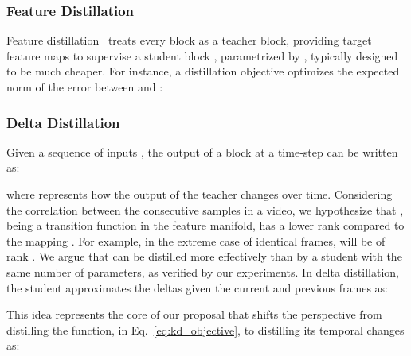 \documentclass[runningheads]{llncs}
\begin{document}
\subsubsection{Feature Distillation}
Feature distillation~\cite{fitnets} treats every block  as a teacher block, providing target feature maps to supervise a student block , parametrized by , typically designed to be much cheaper.
For instance, a distillation objective optimizes the expected  norm of the error between  and :


\subsubsection{Delta Distillation}
Given a sequence of inputs , the output of a block  at a time-step  can be written as:

where  represents how the output of the teacher changes over time. Considering the correlation between the consecutive samples in a video, we hypothesize that , being a transition function in the feature manifold, has a lower rank compared to the mapping . For example, in the extreme case of identical frames,  will be of rank .
We argue that  can be distilled more effectively than  by a student with the same number of parameters, as verified by our experiments. In delta distillation, the student approximates the deltas given the current and previous frames as:

This idea represents the core of our proposal that shifts the perspective from distilling the function, in Eq.~\ref{eq:kd_objective}, to distilling its temporal changes as:
\end{document}
